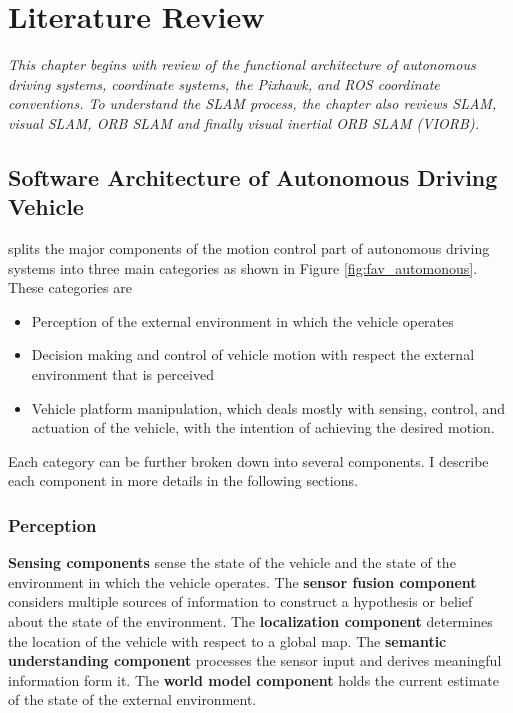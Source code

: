\setlength{\footskip}{8mm}

\chapter{Literature Review} 
\label{ch:literature-review}

\textit{ This chapter begins with review of the functional architecture of autonomous driving systems, coordinate systems, the Pixhawk, and ROS coordinate conventions. To understand the SLAM process, the chapter also reviews SLAM, visual SLAM, ORB SLAM and finally visual inertial ORB SLAM (VIORB).} 

\section{Software Architecture of Autonomous Driving Vehicle}
\label{section-name-in-literature-review}

 splits the major components of the motion control part of autonomous driving systems into three main categories as shown in Figure \ref{fig:fav_automonous}. These categories are

\begin{itemize}
	\item Perception of the external environment in which the vehicle operates
	\item Decision making and control of vehicle motion with respect the external environment that is perceived
	\item Vehicle platform manipulation, which deals mostly with sensing, control, and actuation of the vehicle, with the intention of achieving the desired motion.
\end {itemize}

Each category can be further broken down into several components. I describe each component in more details in the following sections.

\subsection{Perception}

\textbf{Sensing components} sense the state of the vehicle and the state of the environment in which the vehicle operates. The \textbf{sensor fusion component} considers multiple sources of information to construct a hypothesis or belief about the state of the environment. The \textbf{localization component} determines the location of the vehicle with respect to a global map. The \textbf{semantic understanding component} processes the sensor input and derives meaningful information form it. The \textbf{world model component} holds the current estimate of the state of the external environment.


